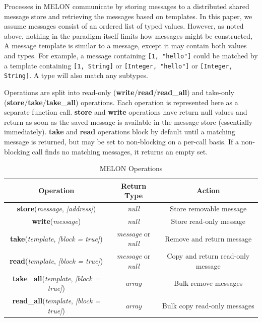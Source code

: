 \documentclass{llncs}
\begin{document}
Processes in MELON communicate by storing messages to a distributed shared message store and retrieving the messages based on templates. In this paper, we assume messages consist of an ordered list of typed values. However, as noted above, nothing in the paradigm itself limits how messages might be constructed,  A message template is similar to a message, except it may contain both values and types. For example, a message containing \texttt{[1, "hello"]} could be matched by a template containing \texttt{[1, String]} or \texttt{[Integer, "hello"]} or \texttt{[Integer, String]}. A type will also match any subtypes.

Operations are split into read-only (\textbf{write}/\textbf{read}/\textbf{read\_all}) and take-only (\textbf{store}/\textbf{take}/\textbf{take\_all}) operations. Each operation is represented here as a separate function call. \textbf{store} and \textbf{write} operations have return null values and return as soon as the saved message is available in the message store (essentially immediately). \textbf{take} and \textbf{read} operations block by default until a matching message is returned, but may be set to non-blocking on a per-call basis. If a non-blocking call finds no matching messages, it returns an empty set.

\begin{table}
\centering
\begin{tabular}{|c|c|c|}
\hline
\textbf{Operation} & \textbf{Return Type} & \textbf{Action} \\ \hline
\textbf{store}(\textit{message}, \textit{[address]}) & \textit{null} & Store removable message \\ \hline
\textbf{write}(\textit{message}) & \textit{null} & Store read-only message \\ \hline
\textbf{take}(\textit{template}, \textit{[block = true]}) & \textit{message} or \textit{null} & Remove and return message \\ \hline
\textbf{read}(\textit{template}, \textit{[block = true]}) & \textit{message} or \textit{null} & Copy and return read-only message \\ \hline
\textbf{take\_all}(\textit{template}, \textit{[block = true]}) & \textit{array} & Bulk remove messages \\ \hline
\textbf{read\_all}(\textit{template}, \textit{[block = true]}) & \textit{array} & Bulk copy read-only messages \\ \hline
\end{tabular}
\caption{MELON Operations}
\end{table}
\end{document}
